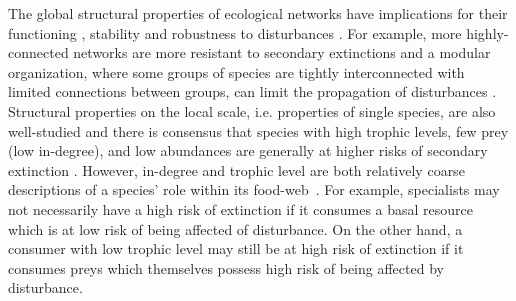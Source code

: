 \documentclass[12pt]{article}
\begin{document}
\begin{spacing}{2.0}
    The global structural properties of ecological networks have implications for their functioning \citep{Petchey2002}, stability \citep{Allesina2012} and robustness to disturbances \citep{Dunne2002d, Eklof2006}. For example, more highly-connected networks are more resistant to secondary extinctions \citep{Dunne2002d, Eklof2006} and a modular organization, where some groups of species are tightly interconnected with limited connections between groups, can limit the propagation of disturbances \citep{}.
    Structural properties on the local scale, i.e. properties of single species, are also well-studied and there is consensus that species with high trophic levels, few prey (low in-degree), and low abundances are generally at higher risks of secondary extinction \citep{binzer2011susceptibility}. However, in-degree and trophic level are both relatively coarse descriptions of a species' role within its food-web~\citep{Cirtwill2018FoodWebs}. 
    For example, specialists may not necessarily have a high risk of extinction if it consumes a basal resource which is at low risk of being affected of disturbance. On the other hand, a consumer with low trophic level may still be at high risk of extinction if it consumes preys which themselves possess high risk of being affected by disturbance. 
    

\end{spacing}
\end{document}
